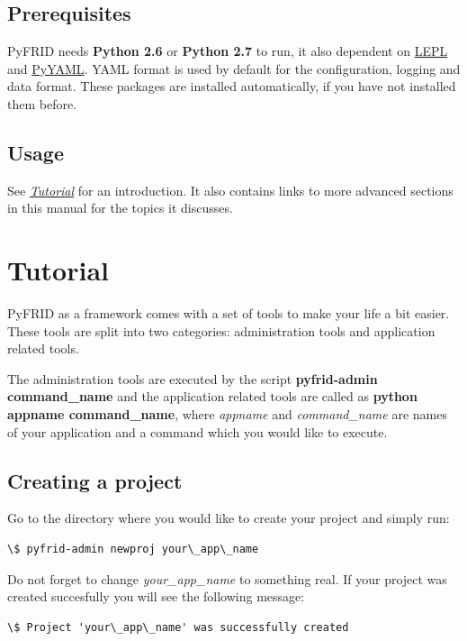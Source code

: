 \documentclass[letterpaper,10pt,english]{sphinxmanual}
\begin{document}
\section{Prerequisites}
\label{intro:prerequisites}
PyFRID needs \textbf{Python 2.6} or \textbf{Python 2.7} to run, it also dependent on \href{http://www.acooke.org/lepl}{LEPL} and \href{http://pyyaml.org/}{PyYAML}.
YAML format is used by default for the configuration, logging and data format. These packages are installed automatically,
if you have not installed them before.


\section{Usage}
\label{intro:usage}\label{intro:pyyaml}
See {\hyperref[tutorial::doc]{\emph{Tutorial}}} for an introduction.  It also contains links to more
advanced sections in this manual for the topics it discusses.


\chapter{Tutorial}
\label{tutorial::doc}\label{tutorial:tutorial}
PyFRID as a framework comes with a set of tools to make your life a bit easier.
These tools are split into two categories: administration tools and application related tools.

The administration tools are executed by the script \textbf{pyfrid-admin command\_name}
and the application related tools are called as \textbf{python appname command\_name},
where \emph{appname} and \emph{command\_name} are names of your application and a command which
you would like to execute.


\section{Creating a project}
\label{tutorial:creating-a-project}
Go to the directory where you would like to create your project and simply run:

\begin{Verbatim}[commandchars=\\\{\}]
\$ pyfrid-admin newproj your\_app\_name
\end{Verbatim}

Do not forget to change \emph{your\_app\_name} to something real.
If your project was created succesfully you will see the following message:

\begin{Verbatim}[commandchars=\\\{\}]
\$ Project 'your\_app\_name' was successfully created
\end{Verbatim}
\end{document}
